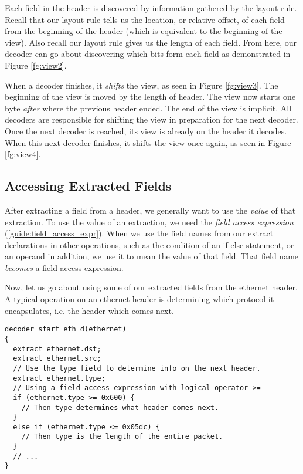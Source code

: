 Each field in the header is discovered by information gathered by the layout
rule. Recall that our layout rule tells us the location, or relative offset, of
each field from the beginning of the header (which is equivalent to the
beginning of the view). Also recall our layout rule gives us the length of each
field. From here, our decoder can go about discovering which bits form each
field as demonstrated in Figure \ref{fg:view2}.

When a decoder finishes, it \textit{shifts} the view, as seen in Figure
\ref{fg:view3}. The beginning of the view is moved by the length of header. The
view now starts one byte \textit{after} where the previous header ended. The end
of the view is implicit. All decoders are responsible for shifting the view in
preparation for the next decoder. Once the next decoder is reached, its view is
already on the header it decodes. When this next decoder finishes, it shifts the
view once again, as seen in Figure \ref{fg:view4}.

\subsection{Accessing Extracted Fields} \label{tut:decoder_access}

After extracting a field from a header, we generally want to use the
\textit{value} of that extraction. To use the value of an extraction, we need
the \textit{field access expression} (\ref{guide:field_access_expr}). When we
use the field names from our extract declarations in other operations, such as
the condition of an if-else statement, or an operand in addition, we use it to
mean the value of that field. That field name \textit{becomes} a field access
expression.

Now, let us go about using some of our extracted fields from the ethernet
header. A typical operation on an ethernet header is determining which protocol
it encapsulates, i.e. the header which comes next.

\begin{codepage}
\begin{lstlisting}
decoder start eth_d(ethernet)
{
  extract ethernet.dst;
  extract ethernet.src;
  // Use the type field to determine info on the next header.
  extract ethernet.type;
  // Using a field access expression with logical operator >=
  if (ethernet.type >= 0x600) {
    // Then type determines what header comes next.
  }
  else if (ethernet.type <= 0x05dc) {
    // Then type is the length of the entire packet.
  }
  // ...
}
\end{lstlisting}
\end{codepage}

